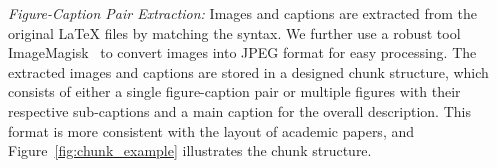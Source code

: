 % 


\noindent\emph{Figure-Caption Pair Extraction:}
Images and captions are extracted from the original LaTeX files by matching the syntax. 
We further use a robust tool ImageMagisk~\cite{imagemagick} to convert images into JPEG format for easy processing.
The extracted images and captions are stored in a designed chunk structure,
which consists of either a single figure-caption pair or multiple figures with their respective sub-captions and a main caption for the overall description.
This format is more consistent with the layout of academic papers, and
Figure~\ref{fig:chunk_example} illustrates the chunk structure.


